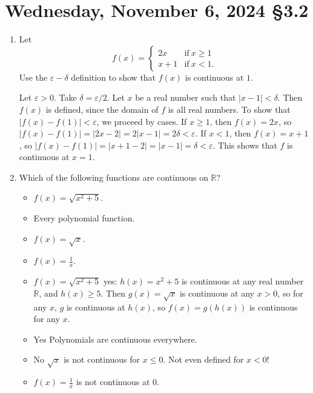 \documentclass[12pt]{amsart}
\def\de{\delta}
\def\ds{\displaystyle}
\def\We{Wednesday}
\def\e{\varepsilon}
\newcommand{\R}{{\mathbb{R}}}
\numberwithin{equation}{section}
\theoremstyle{plain} %
\newcommand{\Nov}[3]{\section{#2, November #1, 2024 \quad \S#3}}
\theoremstyle{definition}
\theoremstyle{remark}
\begin{document}
\newpage

\Nov{6}{\We}{3.2}

\begin{enumerate}
\item Let \[f(x) = \begin{cases} 2x &\text{if} \ x\geq 1 \\ x+1 &\text{if} \ x<1. \end{cases}\]
 Use the $\e-\delta$ definition to show that $f(x)$ is continuous at $1$.
 
\begin{framed}
Let $\e>0$. Take $\de=\e/2$. Let $x$ be a real number such that $|x-1|<\de$. Then $f(x)$ is defined, since the domain of $f$ is all real numbers. To show that $|f(x)-f(1)|<\e$, we proceed by cases. If $x\geq 1$, then $f(x)=2x$, so $|f(x)-f(1)|=|2x-2|=2|x-1|=2\de < \e$. If $x<1$, then $f(x)=x+1$, so $|f(x)-f(1)|=|x+1-2|=|x-1|=\de < \e$. This shows that $f$ is continuous at $x=1$.
\end{framed}

 \item Which of the following functions are continuous on $\R$?
\begin{multicols}{2} 
\begin{itemize}
 \item $f(x)=\sqrt{ x^2 +5}$.
 \item Every polynomial function.
  \item $f(x) = \sqrt{x}$.
  \item $f(x)=\ds\frac{1}{x}$.
 \end{itemize}
 \end{multicols}
 
 \begin{framed}
\begin{itemize}
 \item $f(x)=\sqrt{ x^2 +5}$ yes: $h(x)=x^2+5$ is continuous at any real number $\R$, and $h(x)\geq 5$. Then $g(x)=\sqrt{x}$ is continuous at any $x>0$, so for any $x$, $g$ is continuous at $h(x)$, so $f(x)=g(h(x))$ is continuous for any $x$.
 \item Yes Polynomials are continuous everywhere.
   \item No $\sqrt{x}$ is not continuous for $x\leq 0$. Not even defined for $x<0$!
     \item $f(x)=\ds\frac{1}{x}$ is not continuous at $0$.
 \end{itemize}\end{framed}
 


\end{enumerate}
\end{document}
